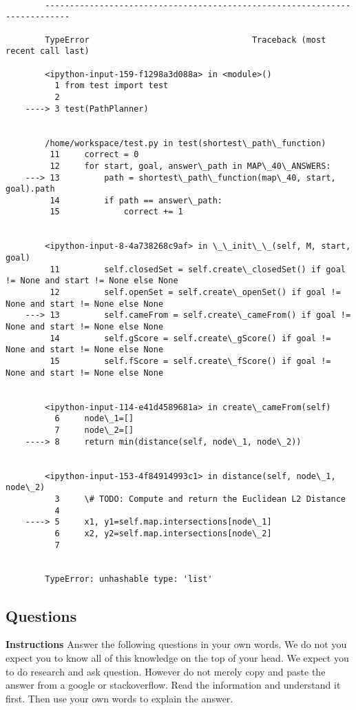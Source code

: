 \documentclass[11pt]{article}
\begin{document}
    \begin{Verbatim}[commandchars=\\\{\}]

        ---------------------------------------------------------------------------

        TypeError                                 Traceback (most recent call last)

        <ipython-input-159-f1298a3d088a> in <module>()
          1 from test import test
          2 
    ----> 3 test(PathPlanner)
    

        /home/workspace/test.py in test(shortest\_path\_function)
         11     correct = 0
         12     for start, goal, answer\_path in MAP\_40\_ANSWERS:
    ---> 13         path = shortest\_path\_function(map\_40, start, goal).path
         14         if path == answer\_path:
         15             correct += 1


        <ipython-input-8-4a738268c9af> in \_\_init\_\_(self, M, start, goal)
         11         self.closedSet = self.create\_closedSet() if goal != None and start != None else None
         12         self.openSet = self.create\_openSet() if goal != None and start != None else None
    ---> 13         self.cameFrom = self.create\_cameFrom() if goal != None and start != None else None
         14         self.gScore = self.create\_gScore() if goal != None and start != None else None
         15         self.fScore = self.create\_fScore() if goal != None and start != None else None


        <ipython-input-114-e41d4589681a> in create\_cameFrom(self)
          6     node\_1=[]
          7     node\_2=[]
    ----> 8     return min(distance(self, node\_1, node\_2))
    

        <ipython-input-153-4f84914993c1> in distance(self, node\_1, node\_2)
          3     \# TODO: Compute and return the Euclidean L2 Distance
          4 
    ----> 5     x1, y1=self.map.intersections[node\_1]
          6     x2, y2=self.map.intersections[node\_2]
          7 


        TypeError: unhashable type: 'list'

    \end{Verbatim}

    \hypertarget{questions}{%
\subsection{Questions}\label{questions}}

\textbf{Instructions} Answer the following questions in your own words.
We do not you expect you to know all of this knowledge on the top of
your head. We expect you to do research and ask question. However do not
merely copy and paste the answer from a google or stackoverflow. Read
the information and understand it first. Then use your own words to
explain the answer.
\end{document}
